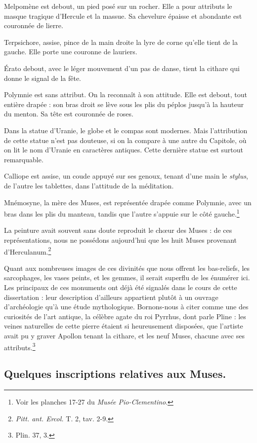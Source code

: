 \documentclass[landscape, a4paper, 11pt, oneside, polutonikogreek, french]{article}
\begin{document}
Melpomène est debout, un pied posé sur un rocher. Elle a pour attributs le masque tragique d'Hercule et la massue. Sa chevelure épaisse et abondante est couronnée de lierre.

Terpsichore, assise, pince de la main droite la lyre de corne qu'elle tient de la gauche. Elle porte une couronne de lauriers.

Érato debout, avec le léger mouvement d'un pas de danse, tient la cithare qui donne le signal de la fête.

Polymnie est sans attribut. On la reconnaît à son attitude. Elle est debout, tout entière drapée : son bras droit se lève sous les plis du péplos jusqu'à la hauteur du menton. Sa tête est couronnée de roses.

Dans la statue d'Uranie, le globe et le compas sont modernes. Mais l'attribution de cette statue n'est pas douteuse, si on la compare à une autre du Capitole, où on lit le nom d'Uranie en caractères antiques. Cette dernière statue est surtout remarquable.

Calliope est assise, un coude appuyé sur ses genoux, tenant d'une main le \emph{stylus}, de l'autre les tablettes, dans l'attitude de la méditation.

Mnémosyne, la mère des Muses, est représentée drapée comme Polymnie, avec un bras dans les plis du manteau, tandis que l'autre s'appuie sur le côté gauche.\footnote{Voir les planches 17-27 du \emph{Musée Pio-Clementino}.}

La peinture avait souvent sans doute reproduit le chœur des Muses : de ces représentations, nous ne possédons aujourd'hui que les huit Muses provenant d'Herculanum.\footnote{\emph{Pitt. ant. Ercol.} T. 2, tav. 2-9.}

Quant aux nombreuses images de ces divinités que nous offrent les bas-reliefs, les sarcophages, les vases peints, et les gemmes, il serait superflu de les énumérer ici. Les principaux de ces monuments ont déjà été signalés dans le cours de cette dissertation : leur description d'ailleurs appartient plutôt à un ouvrage d'archéologie qu'à une étude mythologique. Bornons-nous à citer comme une des curiosités de l'art antique, la célèbre agate du roi Pyrrhus, dont parle Pline : les veines naturelles de cette pierre étaient si heureusement disposées, que l'artiste avait pu y graver Apollon tenant la cithare, et les neuf Muses, chacune avec ses attributs.\footnote{Plin. 37, 3.}
\clearpage
\subsection{Quelques inscriptions relatives aux Muses.}
\end{document}
